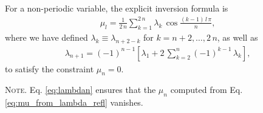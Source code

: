 \documentclass[reprint, floatfix]{revtex4-1}
\newcommand{\note}[1]{{\color{DarkGreen}\footnotesize \textsc{Note.} #1}}
\begin{document}
For a non-periodic variable,
the explicit inversion formula is
%
\begin{align}
  \mu_l
  =
  \frac 1 { 2 \, n }
  \sum_{ k = 1 }^{ 2 \, n }
    \lambda_{ k } \,
    \cos \frac{ (k - 1) \, l \, \pi }
              {            n        }
  ,
\label{eq:mu_from_lambda_refl}
\end{align}
%
where
we have defined
$\lambda_k \equiv \lambda_{n + 2 - k}$
for $k = n + 2, \dots, 2 \, n$,
as well as
%
\begin{align}
  \lambda_{ n + 1 }
  =
  (-1)^{ n - 1 }
  \left[
    \lambda_1
    +
    2 \, \sum_{ k = 2 }^{ n }
      (-1)^{k - 1} \, \lambda_k
  \right]
  ,
\label{eq:lambdan}
\end{align}
to satisfy the constraint $\mu_n = 0$.
%
\note{Eq. \eqref{eq:lambdan}
ensures that the $\mu_n$
computed from Eq. \eqref{eq:mu_from_lambda_refl}
vanishes.

}
\end{document}
